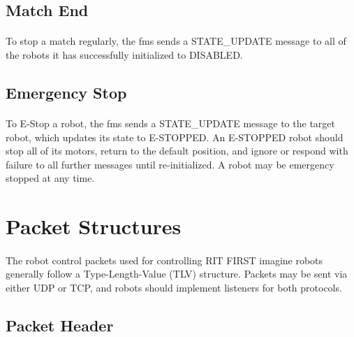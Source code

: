 \documentclass[11pt]{article}
\begin{document}
\subsection {Match End}
\paragraph{}
To stop a match regularly, the \acrshort{fms} sends a STATE\_UPDATE message to 
all of the robots it has successfully initialized to DISABLED.

\subsection{Emergency Stop}
\paragraph{}
To E-Stop a robot, the \acrshort{fms} sends a STATE\_UPDATE message to the target robot, which updates its state to E-STOPPED.
An E-STOPPED robot should stop all of its motors,
return to the default position, and ignore or respond with failure to all further messages until re-initialized.
A robot may be emergency stopped at any time.

\clearpage

\section {Packet Structures}
\paragraph{}
The robot control packets used for controlling RIT FIRST imagine robots generally follow a Type-Length-Value (TLV) structure.
Packets may be sent via either UDP or TCP, and robots should implement listeners for both protocols.

\subsection {Packet Header}
\end{document}
